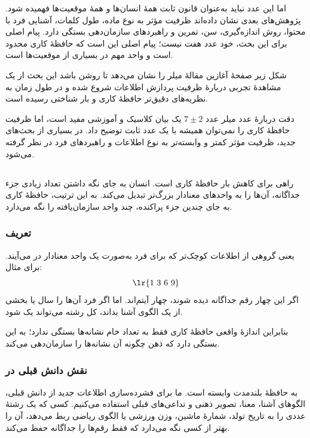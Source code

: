 اما این عدد نباید به‌عنوان قانون ثابت همهٔ انسان‌ها و همهٔ موقعیت‌ها فهمیده شود. پژوهش‌های بعدی نشان داده‌اند ظرفیت مؤثر به نوع ماده، طول کلمات، آشنایی فرد با محتوا، روش اندازه‌گیری، سن، تمرین و راهبردهای سازمان‌دهی بستگی دارد. پیام اصلی برای این بحث، خود عدد هفت نیست؛ پیام اصلی این است که حافظهٔ کاری محدود است و واحد مهم در بسیاری از موقعیت‌ها  است.

شکل زیر صفحهٔ آغازین مقالهٔ میلر را نشان می‌دهد تا روشن باشد این بحث از یک مشاهدهٔ تجربی دربارهٔ ظرفیت پردازش اطلاعات شروع شده و در طول زمان به نظریه‌های دقیق‌تر حافظهٔ کاری و بار شناختی رسیده است.


\begin{correctionbox}{دقت دربارهٔ عدد میلر}
عدد \(7 \pm 2\) یک بیان کلاسیک و آموزشی مفید است، اما ظرفیت حافظهٔ کاری را نمی‌توان همیشه با یک عدد ثابت توضیح داد. در بسیاری از بحث‌های جدید، ظرفیت مؤثر کمتر و وابسته‌تر به نوع اطلاعات و راهبردهای فرد در نظر گرفته می‌شود.
\end{correctionbox}

\subsection{}
 راهی برای کاهش بار حافظهٔ کاری است. انسان به جای نگه داشتن تعداد زیادی جزء جداگانه، آن‌ها را به واحدهای معنادار بزرگ‌تر تبدیل می‌کند. به این ترتیب، حافظهٔ کاری به جای چندین جزء پراکنده، چند واحد سازمان‌یافته را نگه می‌دارد.

\subsubsection{تعریف }
 یعنی گروهی از اطلاعات کوچک‌تر که برای فرد به‌صورت یک واحد معنادار در می‌آیند. برای مثال:
\[
\text{\lr{1 3 6 9}}
\]
اگر این چهار رقم جداگانه دیده شوند، چهار آیتم‌اند. اما اگر فرد آن‌ها را سال  یا بخشی از یک الگوی آشنا بداند، کل رشته می‌تواند یک  شود.

بنابراین اندازهٔ واقعی حافظهٔ کاری فقط به تعداد خام نشانه‌ها بستگی ندارد؛ به این بستگی دارد که ذهن چگونه آن نشانه‌ها را سازمان‌دهی می‌کند.

\subsubsection{نقش دانش قبلی در }
 به حافظهٔ بلندمدت وابسته است. ما برای فشرده‌سازی اطلاعات جدید از دانش قبلی، الگوهای آشنا، معنا، تصویر ذهنی و تداعی‌های قبلی استفاده می‌کنیم. کسی که یک رشتهٔ عددی را به تاریخ تولد، شمارهٔ ماشین، وزن ورزشی یا الگوی ریاضی ربط می‌دهد، آن را بهتر از کسی نگه می‌دارد که فقط رقم‌ها را جداگانه حفظ می‌کند.

